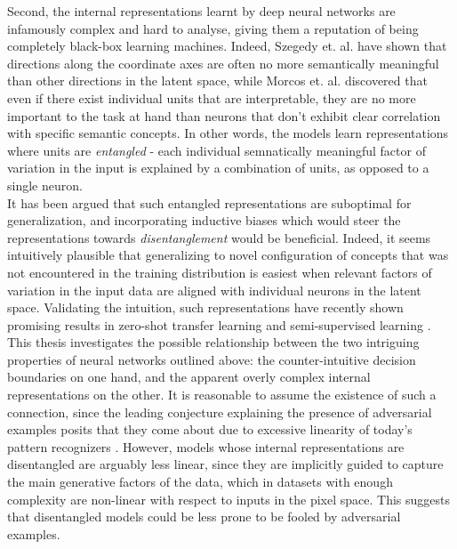 \documentclass{report}
\begin{document}
\noindent Second, the internal representations learnt by deep neural networks are infamously complex and hard to analyse, giving them a reputation of being completely black-box learning machines. Indeed, Szegedy et. al. \cite{intriguing-properties} have shown that directions along the coordinate axes are often no more semantically meaningful than other directions in the latent space, while Morcos et. al. \cite{importance-single-directions} discovered that even if there exist individual units that are interpretable, they are no more important to the task at hand than neurons that don't exhibit clear correlation with specific semantic concepts. In other words, the models learn representations where units are \textit{entangled} - each individual semnatically meaningful factor of variation in the input is explained by a combination of units, as opposed to a single neuron. \\

\noindent It has been argued \cite{bengio-representation} that such entangled representations are suboptimal for generalization, and incorporating inductive biases which would steer the representations towards \textit{disentanglement} would be beneficial. Indeed, it seems intuitively plausible that generalizing to novel configuration of concepts that was not encountered in the training distribution is easiest when relevant factors of variation in the input data are aligned with individual neurons in the latent space. Validating the intuition, such representations have recently shown promising results in zero-shot transfer learning \cite{darla} and semi-supervised learning \cite{dgpose}. \\

\noindent This thesis investigates the possible relationship between the two intriguing properties of neural networks outlined above: the counter-intuitive decision boundaries on one hand, and the apparent overly complex internal representations on the other. It is reasonable to assume the existence of such a connection, since the leading conjecture explaining the presence of adversarial examples posits that they come about due to excessive linearity of today's pattern recognizers \cite{explaining-and-harnessing}. However, models whose internal representations are disentangled are arguably less linear, since they are implicitly guided to capture the main generative factors of the data, which in datasets with enough complexity are non-linear with respect to inputs in the pixel space. This suggests that disentangled models could be less prone to be fooled by adversarial examples. \\
\end{document}
